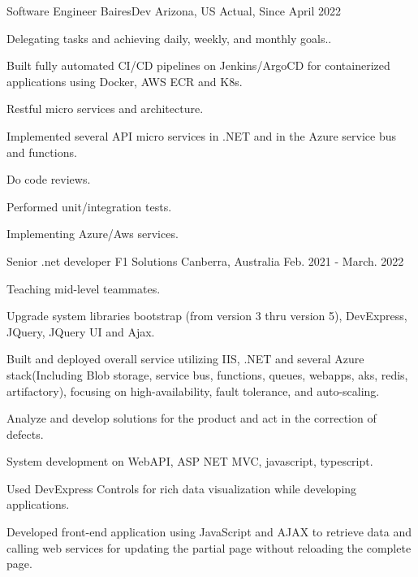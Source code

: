 

\begin{cventries}

  \cventry
    {Software Engineer} %
    {BairesDev} %
    {Arizona, US} %
    {Actual, Since April 2022} %
    {
      \begin{cvitems} %
        \item {Delegating tasks and achieving daily, weekly, and monthly goals..}
        \item {Built fully automated CI/CD pipelines on Jenkins/ArgoCD for containerized applications using Docker, AWS ECR and K8s.}
        \item {Restful micro services and architecture.}
        \item {Implemented several API micro services in .NET and in the Azure service bus and functions.}
        \item {Do code reviews.}
        \item {Performed unit/integration tests.}
        \item {Implementing Azure/Aws services.}
      \end{cvitems}
    }

  \cventry
    {Senior .net developer} %
    {F1 Solutions} %
    {Canberra, Australia} %
    {Feb. 2021 - March. 2022} %
    {
      \begin{cvitems} %
        \item {Teaching mid-level teammates.}
        \item {Upgrade system libraries bootstrap (from version 3 thru version 5), DevExpress, JQuery, JQuery UI and Ajax.}
        \item {Built and deployed overall service utilizing IIS, .NET and several Azure stack(Including Blob storage, service bus, functions, queues, webapps, aks, redis, artifactory), focusing on high-availability, fault tolerance, and auto-scaling.}
        \item {Analyze and develop solutions for the product and act in the correction of defects.}
        \item {System development on WebAPI, ASP NET MVC, javascript, typescript.}
        \item {Used DevExpress Controls for rich data visualization while developing applications.}
        \item { Developed front-end application using JavaScript and AJAX to retrieve data and calling web services for updating the partial page without reloading the complete page.}
      \end{cvitems}
    }


\end{cventries}
